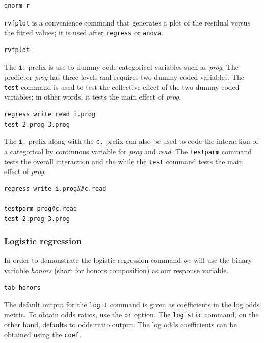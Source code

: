 \documentclass{article}
\begin{document}
\begin{lstlisting}
qnorm r
\end{lstlisting}

\lstinline{rvfplot} is a convenience command that generates a plot of the residual versus the fitted values; it is used after \lstinline{regress} or \lstinline{anova}.

\begin{lstlisting}
rvfplot
\end{lstlisting}

The \lstinline{i.} prefix is use to dummy code categorical variables such as \textit{prog}. The predictor \textit{prog} has three levels and requires two dummy-coded variables. The \lstinline{test} command is used to test the collective effect of the two dummy-coded variables; in other words, it tests the main effect of \textit{prog}.

\begin{lstlisting}
regress write read i.prog
test 2.prog 3.prog
\end{lstlisting}


The \lstinline{i.} prefix along with the \lstinline{c.} prefix can also be used to code the interaction of a categorical by continuous variable for \textit{prog} and \textit{read}. The \lstinline{testparm} command tests the overall interaction and the while the \lstinline{test} command tests the main effect of \textit{prog}.

\begin{lstlisting}
regress write i.prog##c.read

testparm prog#c.read
test 2.prog 3.prog
\end{lstlisting}

\subsubsection{Logistic regression}

In order to demonstrate the logistic regression command we will use the binary variable \textit{honors} (short for honors composition) as our response variable.

\begin{lstlisting}
tab honors
\end{lstlisting}

The default output for the \lstinline{logit} command is given as coefficients in the log odds metric. To obtain odds ratios, use the \lstinline{or} option. The \lstinline{logistic} command, on the other hand, defaults to odds ratio output. The log odds coefficients can be obtained using the \lstinline{coef}.
\end{document}
